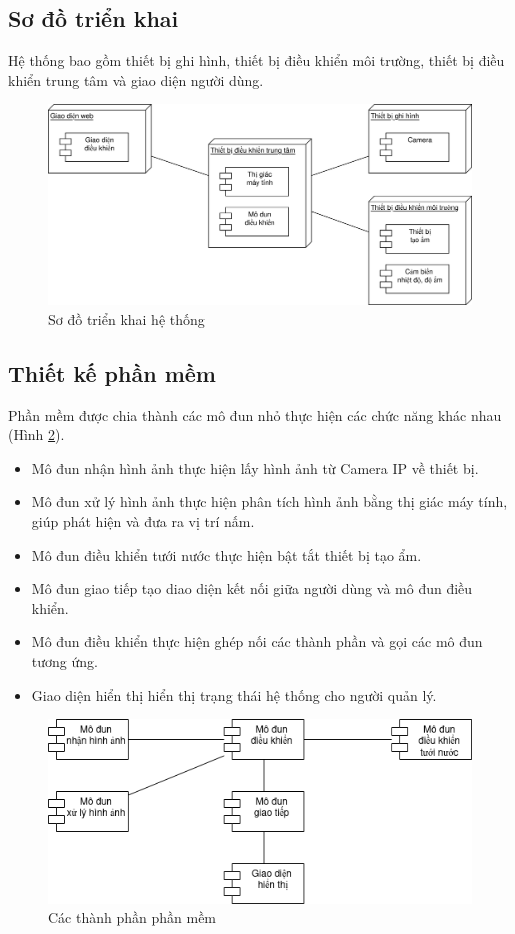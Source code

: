 \subsection{Sơ đồ triển khai}

Hệ thống bao gồm thiết bị ghi hình, thiết bị điều khiển môi trường, thiết bị điều khiển trung tâm và giao diện người dùng.

\begin{figure}[h]
    \centering
    \includegraphics[width=0.75\linewidth]{images/deploy.png}
    \caption{Sơ đồ triển khai hệ thống}
    \label{fig:deploy}
\end{figure}

\subsection{Thiết kế phần mềm}

Phần mềm được chia thành các mô đun nhỏ thực hiện các chức năng khác nhau (Hình \ref{fig:software-component}).

\begin{itemize}
    \item Mô đun nhận hình ảnh thực hiện lấy hình ảnh từ Camera IP về thiết bị.
    \item Mô đun xử lý hình ảnh thực hiện phân tích hình ảnh bằng thị giác máy tính, giúp phát hiện và đưa ra vị trí nấm.
    \item Mô đun điều khiển tưới nước thực hiện bật tắt thiết bị tạo ẩm.
    \item Mô đun giao tiếp tạo diao diện kết nối giữa người dùng và mô đun điều khiển.
    \item Mô đun điều khiển thực hiện ghép nối các thành phần và gọi các mô đun tương ứng.
    \item Giao diện hiển thị hiển thị trạng thái hệ thống cho người quản lý.
\end{itemize}

\begin{figure}
    \centering
    \includegraphics[width=0.75\linewidth]{images/software-component.png}
    \caption{Các thành phần phần mềm}
    \label{fig:software-component}
\end{figure}

